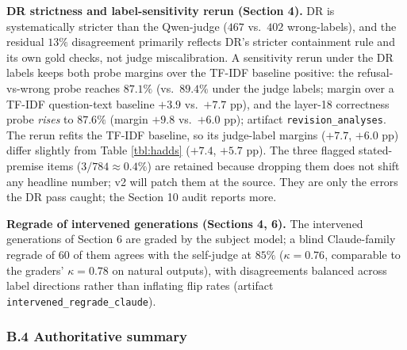 \textbf{DR strictness and label-sensitivity rerun (Section 4).} DR is
systematically stricter than the Qwen-judge (\(467\) vs.~\(402\)
wrong-labels), and the residual \(13\%\) disagreement primarily reflects
DR's stricter containment rule and its own gold checks, not judge miscalibration. A sensitivity rerun under the DR labels keeps both probe margins over the TF-IDF baseline positive: the refusal-vs-wrong probe reaches \(87.1\%\) (vs.~\(89.4\%\)
under the judge labels; margin over a TF-IDF question-text baseline
\(+3.9\) vs.~\(+7.7\) pp), and the layer-18 correctness probe
\emph{rises} to \(87.6\%\) (margin \(+9.8\) vs.~\(+6.0\) pp); artifact \texttt{revision\_analyses}. The rerun refits the TF-IDF baseline, so its judge-label margins (\(+7.7\), \(+6.0\) pp) differ slightly from Table \ref{tbl:hadds} (\(+7.4\), \(+5.7\) pp). The three flagged stated-premise items
(\(3/784 \approx 0.4\%\)) are retained because dropping them does not shift any headline number; v2 will patch them at the source. They are only the errors the DR pass caught; the Section 10 audit reports more.

\textbf{Regrade of intervened generations (Sections 4, 6).} The
intervened generations of Section 6 are graded by the subject model; a
blind Claude-family regrade of \(60\) of them agrees with the self-judge
at \(85\%\) (\(\kappa = 0.76\), comparable to the graders'
\(\kappa = 0.78\) on natural outputs), with disagreements balanced
across label directions rather than inflating flip rates (artifact
\texttt{intervened\_regrade\_claude}).

\subsubsection{B.4 Authoritative
summary}\label{b.4-authoritative-summary}

